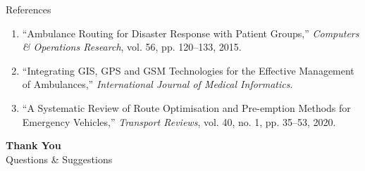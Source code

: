 \documentclass[aspectratio=169,11pt]{beamer}
\begin{document}
\begin{frame}{References}

\begin{enumerate}
\itemsep3pt

\item ``Ambulance Routing for Disaster Response with Patient Groups,''
\textit{Computers \& Operations Research}, vol. 56, pp. 120--133, 2015.

\item ``Integrating GIS, GPS and GSM Technologies for the Effective Management of Ambulances,''
\textit{International Journal of Medical Informatics}.

\item ``A Systematic Review of Route Optimisation and Pre-emption Methods for Emergency Vehicles,''
\textit{Transport Reviews}, vol. 40, no. 1, pp. 35--53, 2020.


\end{enumerate}

\vfill

\begin{center}

\colorbox{GEUBlue}{
\parbox{0.78\textwidth}{
\centering
\color{white}
\textbf{\large Thank You}\\[1mm]
Questions \& Suggestions
}}

\end{center}

\end{frame}


\end{document}
